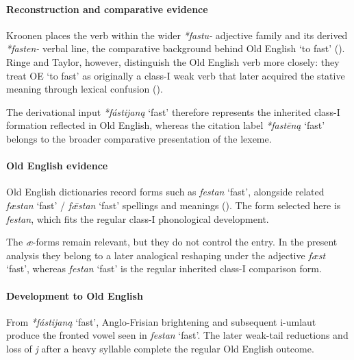 \documentclass[
  british,
  a4paper,
]{article}
\providecommand{\Recon}[1]{\emph{*#1}}
\begin{document}
\paragraph{Reconstruction and comparative
evidence}\label{reconstruction-and-comparative-evidence-95}

Kroonen places the verb within the wider {\emph{*fastu-}} adjective
family and its derived {\emph{*fasten-}} verbal line, the comparative
background behind Old English `to fast'
(). Ringe and Taylor,
however, distinguish the Old English verb more closely: they treat OE
`to fast' as originally a class-I weak verb that later acquired the
stative meaning through lexical confusion
().

The derivational input \Recon{fástijaną} `fast' therefore represents the
inherited class-I formation reflected in Old English, whereas the
citation label \Recon{fastēną} `fast' belongs to the broader comparative
presentation of the lexeme.

\paragraph{Old English evidence}\label{old-english-evidence-97}

Old English dictionaries record forms such as {\emph{festan}} `fast',
alongside related {\emph{fæstan}} `fast' / {\emph{fǣstan}} `fast'
spellings and meanings (). The form selected here is {\emph{festan}}, which
fits the regular class-I phonological development.

The \emph{æ}-forms remain relevant, but they do not control the entry.
In the present analysis they belong to a later analogical reshaping
under the adjective {\emph{fæst}} `fast', whereas {\emph{festan}} `fast'
is the regular inherited class-I comparison form.

\paragraph{Development to Old
English}\label{development-to-old-english-95}

From \Recon{fástijaną} `fast', Anglo-Frisian brightening and subsequent
i-umlaut produce the fronted vowel seen in {\emph{festan}} `fast'. The
later weak-tail reductions and loss of \emph{j} after a heavy syllable
complete the regular Old English outcome.
\end{document}
